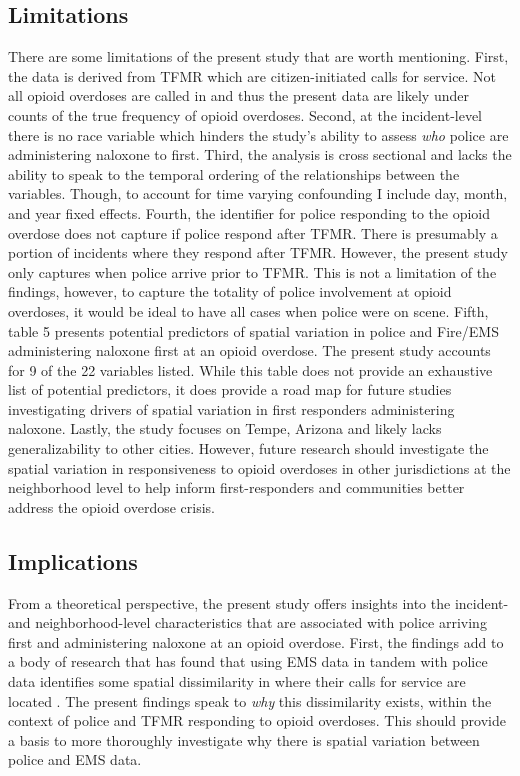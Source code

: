 \subsection{Limitations}
There are some limitations of the present study that are worth mentioning. First, the data is derived from TFMR which are citizen-initiated calls for service. Not all opioid overdoses are called in and thus the present data are likely under counts of the true frequency of opioid overdoses. Second, at the incident-level there is no race variable which hinders the study's ability to assess \textit{who} police are administering naloxone to first. Third, the analysis is cross sectional and lacks the ability to speak to the temporal ordering of the relationships between the variables. Though, to account for time varying confounding I include day, month, and year fixed effects. Fourth, the identifier for police responding to the opioid overdose does not capture if police respond after TFMR. There is presumably a portion of incidents where they respond after TFMR. However, the present study only captures when police arrive prior to TFMR. This is not a limitation of the findings, however, to capture the totality of police involvement at opioid overdoses, it would be ideal to have all cases when police were on scene. Fifth, table 5 presents potential predictors of spatial variation in police and Fire/EMS administering naloxone first at an opioid overdose. The present study accounts for 9 of the 22 variables listed. While this table does not provide an exhaustive list of potential predictors, it does provide a road map for future studies investigating drivers of spatial variation in first responders administering naloxone. Lastly, the study focuses on Tempe, Arizona and likely lacks generalizability to other cities. However, future research should investigate the spatial variation in responsiveness to opioid overdoses in other jurisdictions at the neighborhood level to help inform first-responders and communities better address the opioid overdose crisis. 

\subsection{Implications}

From a theoretical perspective, the present study offers insights into the incident- and neighborhood-level characteristics that are associated with police arriving first and administering naloxone at an opioid overdose. First, the findings add to a body of research that has found that using EMS data in tandem with police data identifies some spatial dissimilarity in where their calls for service are located \parencite{hibdon_use_2024}. The present findings speak to \textit{why} this dissimilarity exists, within the context of police and TFMR responding to opioid overdoses. This should provide a basis to more thoroughly investigate why there is spatial variation between police and EMS data.

